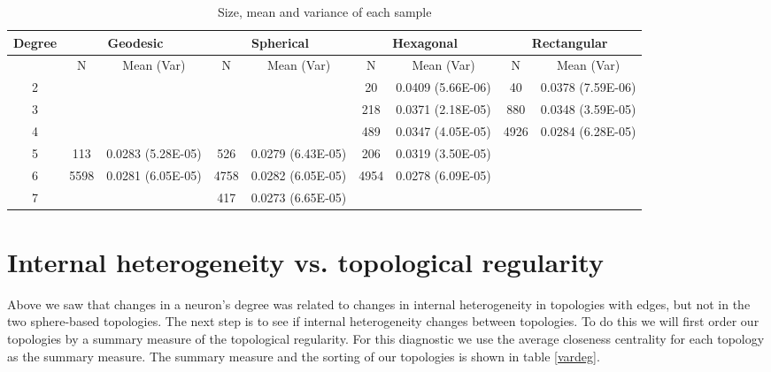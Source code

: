 \begin{table}
\centering
\scriptsize
\begin{minipage}{\textwidth}
\caption{Size, mean and variance of each sample}
\label{meanvar1}
\begin{tabular}{|c||cc|cc|cc|cc|}
\hline
\textbf{Degree} & \multicolumn{2}{c|}{\textbf{Geodesic}} &
\multicolumn{2}{c|}{\textbf{Spherical}} &
\multicolumn{2}{c|}{\textbf{Hexagonal}} &
\multicolumn{2}{c|}{\textbf{Rectangular}} \\
\hline
& N & Mean (Var) & N & Mean (Var) & N & Mean (Var) & N & Mean (Var) \\
\hline
2&&&&& 20& 0.0409 (5.66E-06)& 40& 0.0378 (7.59E-06)\\ 
3&&&&& 218& 0.0371 (2.18E-05)& 880& 0.0348 (3.59E-05)\\ 
4&&&&& 489& 0.0347 (4.05E-05)& 4926& 0.0284 (6.28E-05)\\ 
5& 113& 0.0283 (5.28E-05)& 526& 0.0279 (6.43E-05)& 206& 0.0319 (3.50E-05)&&\\ 
6& 5598& 0.0281 (6.05E-05)& 4758& 0.0282 (6.05E-05)& 4954& 0.0278
(6.09E-05)&&\\ 
7&&& 417& 0.0273 (6.65E-05)&&&&\\ 
\hline
\end{tabular} \end{minipage} \end{table}






\section{Internal heterogeneity vs. topological regularity}
\label{rdq2}
Above we saw that changes in a neuron's degree was related to changes in
internal heterogeneity in topologies with edges, but not in the two sphere-based
topologies. The next step is to see if internal heterogeneity changes between
topologies.  To do this we will first order our topologies by a summary
measure of the topological regularity.  For this diagnostic we use the average
closeness centrality for each topology as the summary measure.  The summary
measure and the sorting of our topologies is shown in table \ref{vardeg}.


